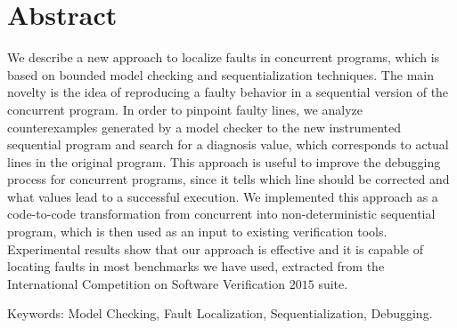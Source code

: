 \chapter*{Abstract}
\thispagestyle{empty}

We describe a new approach to localize faults in concurrent programs, which is based on bounded model checking and sequentialization techniques. The main novelty is the idea of reproducing a faulty behavior in a sequential version of the concurrent program. In order to pinpoint faulty lines, we analyze counterexamples generated by a model checker to the new instrumented sequential program and search for a diagnosis value, which corresponds to actual lines in the original program. This approach is useful to improve the debugging process for concurrent programs, since it tells which line should be corrected and what values lead to a successful execution. We implemented this approach as a code-to-code transformation from concurrent into non-deterministic sequential program, which is then used as an input to existing verification tools. Experimental results show that our approach is effective and it is capable of locating faults in most benchmarks we have used, extracted from the International Competition on Software Verification $2015$ suite.


\noindent \textsf{Keywords:} Model Checking, Fault Localization, Sequentialization, Debugging.

\cleardoublepage
